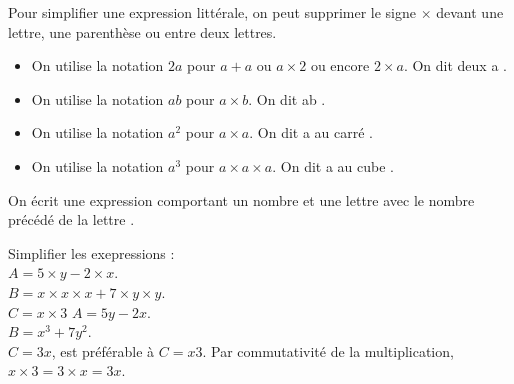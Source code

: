 Pour simplifier une expression littérale, on peut supprimer le signe \og $\times$ \fg{} devant une lettre, une parenthèse ou entre deux lettres. 

\begin{propriete}
   \begin{itemize}
      \item On utilise la notation $2a$ pour $a+a$ ou $a\times2$ ou encore $2\times a$. On dit \og deux a \fg.
      \item On utilise la notation $ab$ pour $a\times b$. On dit \og ab \fg.
      \item On utilise la notation $a^2$ pour $a\times a$. On dit \og a au carré \fg.
      \item On utilise la notation $a^3$ pour $a\times a\times a$. On dit \og a au cube \fg. \\ [-8mm]
   \end{itemize}
\end{propriete}

\bigskip

On écrit une expression comportant un nombre et une \og lettre \fg{} avec le nombre précédé de la \og lettre \fg.

\begin{exemple}[0.5]
   Simplifier les exepressions : \\
   $A =5\times y-2\times x$. \\
   $B =x\times x \times x + 7\times y\times y$. \\
   $C =x\times3$
   \correction
      $A =5y-2x$. \\
      $B =x^3+7y^2$. \\
      $C =3x$, est préférable à $C=x3$. Par commutativité de la multiplication, $x\times3 =3\times x =3x$.
\end{exemple}


\exercicesbase

